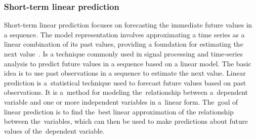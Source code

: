 \documentclass[12pt]{article}
\begin{document}
\subsubsection{Short-term linear prediction}\label{slp}
Short-term linear prediction focuses on forecasting the immediate future values in a sequence.
The model representation involves approximating a time series as a linear
combination of its past values, providing a foundation for estimating the next value~\cite{WOS:000836807400001}.
Is a technique commonly used in signal processing and time-series analysis to predict future
values in a sequence based on a linear model.
The basic idea is to use past observations in a sequence to estimate the next value.
Linear prediction is a~statistical technique used to forecast future values based on past
observations. It is a~method for modeling the~relationship between a~dependent variable and
one or more independent variables in a~linear form. The~goal of linear prediction is to find
the~best linear approximation of the relationship between the~variables, which can then be
used to make predictions about future values of the~dependent variable.
%
\end{document}
